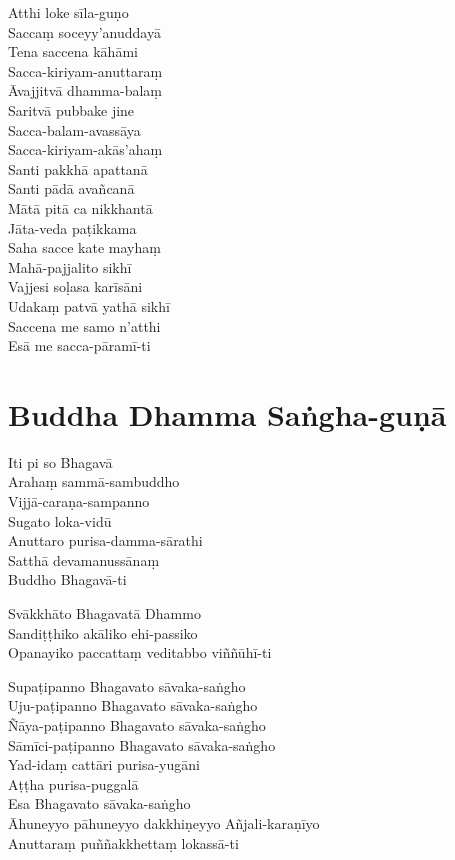 \begin{paritta}
Atthi loke sīla-guṇo\\
Saccaṃ soceyy'anuddayā\\
Tena saccena kāhāmi\\
Sacca-kiriyam-anuttaraṃ\\
Āvajjitvā dhamma-balaṃ\\
Saritvā pubbake jine\\
Sacca-balam-avassāya\\
Sacca-kiriyam-akās'ahaṃ\\
Santi pakkhā apattanā\\
Santi pādā avañcanā\\
Mātā pitā ca nikkhantā\\
Jāta-veda paṭikkama\\
Saha sacce kate mayhaṃ\\
Mahā-pajjalito sikhī\\
Vajjesi soḷasa karīsāni\\
Udakaṃ patvā yathā sikhī\\
Saccena me samo n'atthi\\
Esā me sacca-pāramī-ti

\end{paritta}

\chapter{Buddha Dhamma Saṅgha-guṇā}%

\begin{paritta}
Iti pi so Bhagavā\\
Arahaṃ sammā-sambuddho\\
Vijjā-caraṇa-sampanno\\
Sugato loka-vidū\\
Anuttaro purisa-damma-sārathi\\
Satthā devamanussānaṃ\\
Buddho Bhagavā-ti

Svākkhāto Bhagavatā Dhammo\\
Sandiṭṭhiko akāliko ehi-passiko\\
Opanayiko paccattaṃ veditabbo viññūhī-ti

Supaṭipanno Bhagavato sāvaka-saṅgho\\
Uju-paṭipanno Bhagavato sāvaka-saṅgho\\
Ñāya-paṭipanno Bhagavato sāvaka-saṅgho\\
Sāmīci-paṭipanno Bhagavato sāvaka-saṅgho\\
Yad-idaṃ cattāri purisa-yugāni\\
Aṭṭha purisa-puggalā\\
Esa Bhagavato sāvaka-saṅgho\\
Āhuneyyo pāhuneyyo dakkhiṇeyyo Añjali-karaṇīyo\\
Anuttaraṃ puññakkhettaṃ lokassā-ti
\end{paritta}

